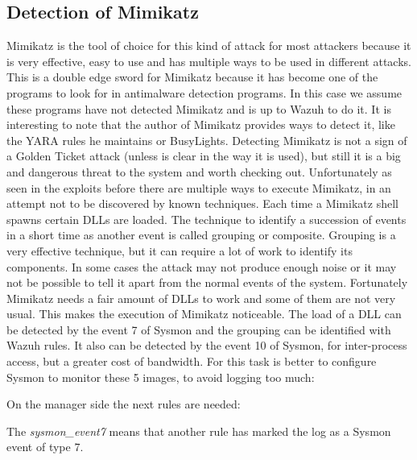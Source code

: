 \subsection{Detection of Mimikatz}
Mimikatz is the tool of choice for this kind of attack for most attackers because it is very effective, easy to use and has multiple ways to be used in different attacks\cite{mimikatz_github}\cite{mimikatz_details}. This is a double edge sword for Mimikatz because it has become one of the programs to look for in antimalware detection programs. In this case we assume these programs have not detected Mimikatz and is up to Wazuh to do it. It is interesting to note that the author of Mimikatz provides ways to detect it, like the YARA rules he maintains\cite{mimikatz_github} or BusyLights\cite{understanding_powersploit_mimikatz}.
\linej
\linej
Detecting Mimikatz is not a sign of a Golden Ticket attack (unless is clear in the way it is used), but still it is a big and dangerous threat to the system and worth checking out.
\linej
Unfortunately as seen in the exploits before there are multiple ways to execute Mimikatz, in an attempt not to be discovered by known techniques.
\linej
\linej
Each time a Mimikatz shell spawns certain DLLs are loaded. The technique to identify a succession of events in a short time as another event is called grouping or composite.
Grouping is a very effective technique, but it can require a lot of work to identify its components. In some cases the attack may not produce enough noise or it may not be possible to tell it apart from the normal events of the system\cite{sysmon}\cite{sysmon_event_7_mimikatz}.
\linej
Fortunately Mimikatz needs a fair amount of DLLs to work and some of them are not very usual. This makes the execution of Mimikatz noticeable.
\linej
\linej
The load of a DLL can be detected by the event 7 of Sysmon and the grouping can be identified with Wazuh rules. It also can be detected by the event 10 of Sysmon, for inter-process access, but a greater cost of bandwidth.
For this task is better to configure Sysmon to monitor these 5 images, to avoid logging too much:
\linej

\linej
On the manager side the next rules are needed:
\linej

The \textit{sysmon\_event7} means that another rule has marked the log as a Sysmon event of type 7.
